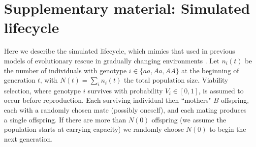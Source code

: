 \documentclass[]{article}
\begin{document}
\newpage


\setcounter{figure}{0}
\renewcommand{\thefigure}{S\arabic{figure}}
\setcounter{table}{0}
\renewcommand{\thetable}{S\arabic{table}}
\setcounter{section}{0}
\renewcommand{\thesection}{S\arabic{section}}
\setcounter{equation}{0}
\renewcommand{\theequation}{S\arabic{equation}}

\section*{Supplementary material: Simulated lifecycle}
\label{sec:lifecycle}

Here we describe the simulated lifecycle, which mimics that used in previous models of evolutionary rescue in gradually changing environments \citep{burger1995evolution}.
Let $n_i(t)$ be the number of individuals with genotype $i\in\{aa,Aa,AA\}$ at the beginning of generation $t$, with $N(t) =  \sum_i{n_i(t)}$ the total population size.
Viability selection, where genotype $i$ survives with probability $V_i\in[0,1]$, is assumed to occur before reproduction.
Each surviving individual then ``mothers" $B$ offspring, each with a randomly chosen mate (possibly oneself), and each mating produces a single offspring. 
If there are more than $N(0)$ offspring (we assume the population starts at carrying capacity) we randomly choose $N(0)$ to begin the next generation.
\end{document}
